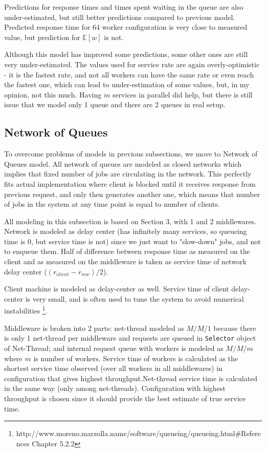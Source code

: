 \documentclass[11pt,a4paper]{article}
\begin{document}
Predictions for response times and times spent waiting in the queue are also under-estimated, but still better predictions compared to previous model. Predicted response time for 64 worker configuration is very close to measured value, but prediction for $\mathbb{E}[w]$ is not.

Although this model has improved some predictions, some other ones are still very under-estimated. The values used for service rate are again overly-optimistic - it is the fastest rate, and not all workers can have the same rate or even reach the fastest one, which can lead to under-estimation of some values, but, in my opinion, not this much. Having $m$ services in parallel did help, but there is still issue that we model only 1 queue and there are 2 queues in real setup.
	


\subsection{Network of Queues}

To overcome problems of models in previous subsections, we move to Network of Queues model. All network of queues are modeled as closed networks which implies that fixed number of jobs are circulating in the network. This perfectly fits actual implementation where client is blocked until it receives response from previous request, and only then generates another one, which means that number of jobs in the system at any time point is equal to number of clients.

All modeling in this subsection is based on Section 3, with 1 and 2 middlewares. Network is modeled as delay center (has infinitely many services, so queueing time is 0, but service time is not) since we just want to "slow-down" jobs, and not to enqueue them. Half of difference between response time as measured on the client and as measured on the middleware is taken as service time of network delay center ($(r_{client} - r_{mw})/2$). 

Client machine is modeled as delay-center as well. Service time of client delay-center is very small, and is often used to tune the system to avoid numerical instabilities \footnote{http://www.moreno.marzolla.name/software/queueing/queueing.html\#References  Chapter 5.2.2}.

Middleware is broken into 2 parts: net-thread modeled as $M/M/1$ because there is only 1 net-thread per middleware and requests are queued in \texttt{Selector} object of Net-Thread; and internal request queue with workers is modeled as $M/M/m$ where $m$ is number of workers. Service time of workers is calculated as the shortest service time observed (over all workers in all middlewares) in configuration that gives highest throughput.Net-thread service time is calculated in the same way (only among net-threads). Configuration with highest throughput is chosen since it should provide the best estimate of true service time.
\end{document}
